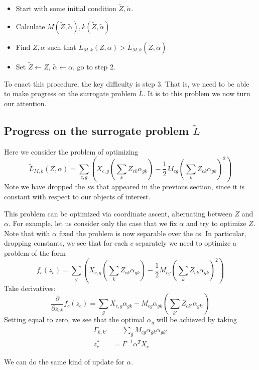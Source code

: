 \documentclass{article}
\begin{document}
\begin{itemize}
    \item Start with some initial condition $\tilde Z,\tilde \alpha$.
    \item Calculate $M(\tilde Z,\tilde \alpha),k(\tilde Z,\tilde \alpha)$
    \item Find $Z,\alpha$ such that $\tilde L_{M,k}(Z,\alpha)>\tilde L_{M,k}(\tilde Z,\tilde \alpha)$
    \item Set $\tilde Z \gets Z$, $\tilde \alpha \gets \alpha$, go to step 2.
\end{itemize}

To enact this procedure, the key difficulty is step 3.  That is, we need to be able to make progress on the surrogate problem $\tilde L$.  It is to this problem we now turn our attention.

\subsection{Progress on the surrogate problem $\tilde L$}

Here we consider the problem of optimizing 
\[
\tilde L_{M,k}(Z,\alpha) = \sum_{c,g} \left(X_{c,g}\left(\sum_k Z_{ck} \alpha_{gk}\right) - \frac{1}{2}M_{cg}\left(\sum_k Z_{ck} \alpha_{gk}\right)^2 \right)
\]
Note we have dropped the $\kappa$s that appeared in the previous section, since it is constant with respect to our objects of interest.  

This problem can be optimized via coordinate ascent, alternating between $Z$ and $\alpha$.  For example, let us consider only the case that we fix $\alpha$ and try to optimize $Z$.  Note that with $\alpha$ fixed the problem is now separable over the $c$s.  In particular, dropping constants, we see that for each $c$ separately we need to optimize a problem of the form
\[
f_c(z_c) = \sum_{g} \left(X_{c,g}\left(\sum_k Z_{ck} \alpha_{gk}\right) - \frac{1}{2}M_{cg}\left(\sum_k Z_{ck} \alpha_{gk}\right)^2 \right)
\]
Take derivatives:
\[
\frac{\partial}{\partial z_{ck}}f_c(z_c) = \sum_{g} X_{c,g}\alpha_{gk} - M_{cg}\alpha_{gk}\left(\sum_{k'} Z_{ck'} \alpha_{gk'}\right) 
\]
Setting equal to zero, we see that the optimal $\alpha_g$ will be achieved by taking
\begin{align*}
\Gamma_{k,k'} &= \sum_g M_{cg}\alpha_{gk}\alpha_{gk'}\\
z_c^* &= \Gamma^{-1} \alpha^T X_c
\end{align*}

We can do the same kind of update for $\alpha$.
\end{document}
